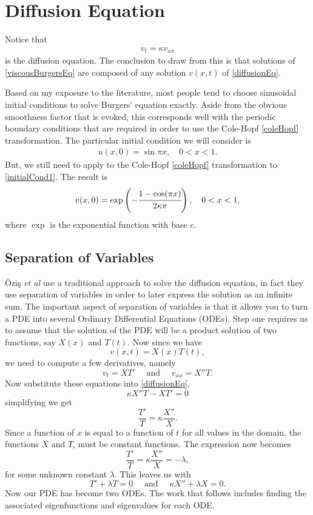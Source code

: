\documentclass[undefended]{sfuthesis}
\begin{document}
\section{Diffusion Equation}

Notice that 
\begin{align}
v_t = \kappa v_{xx} \label{diffusionEq}
\end{align}
is the diffusion equation. The conclusion to draw from this is that solutions of \eqref{viscousBurgersEq} are composed of any solution $v(x, t)$ of \eqref{diffusionEq}.

Based on my exposure to the literature, most people tend to choose sinusoidal initial conditions to solve Burgers' equation exactly. Aside from the obvious smoothness factor that is evoked, this corresponds well with the periodic boundary conditions that are required in order to use the Cole-Hopf \eqref{coleHopf} transformation. The particular initial condition we will consider is
\begin{align}
u(x, 0) = \sin \pi x, \quad 0 < x < 1. \label{initialCond1}
\end{align}
But, we still need to apply to the Cole-Hopf \eqref{coleHopf} transformation to \eqref{initialCond1}. The result is
\begin{align}
v(x, 0) = \exp\left(-\cfrac{1 - \cos (\pi x)}{2 \kappa \pi}\right), \quad 0 < x < 1, \label{initialCond1ColeHopf}
\end{align} 
where $\exp$ is the exponential function with base $e$.

\subsection{Separation of Variables}

\"Ozi\c{s} \textit{et al} \cite{burgerFiniteElement} use a traditional approach to solve the diffusion equation, in fact they use separation of variables \cite{PDEtextbook} in order to later express the solution as an infinite sum. The important aspect of separation of variables is that it allows you to turn a PDE into several Ordinary Differential Equations (ODEs). Step one requires us to assume that the solution of the PDE will be a product solution of two functions, say $X(x)$ and $T(t)$. Now since we have \[v(x, t) = X(x) T(t),\] we need to compute a few derivatives, namely \[v_t = XT' \quad \text{ and } \quad v_{xx} = X''T.\] Now substitute these equations into \eqref{diffusionEq}, \[\kappa X''T - XT' = 0\] simplifying we get \[\frac{T'}{T} = \kappa \frac{X''}{X}.\] Since a function of $x$ is equal to a function of $t$ for all values in the domain, the functions $X$ and $T$, must be constant functions. The expression now becomes \[\frac{T'}{T} = \kappa \frac{X''}{X} = -\lambda,\] for some unknown constant $\lambda$. This leaves us with \[T' + \lambda T = 0 \quad \text{ and } \quad \kappa X'' + \lambda X = 0.\] Now our PDE has become two ODEs. The work that follows includes finding the associated eigenfunctions and eigenvalues for each ODE. 
\end{document}
